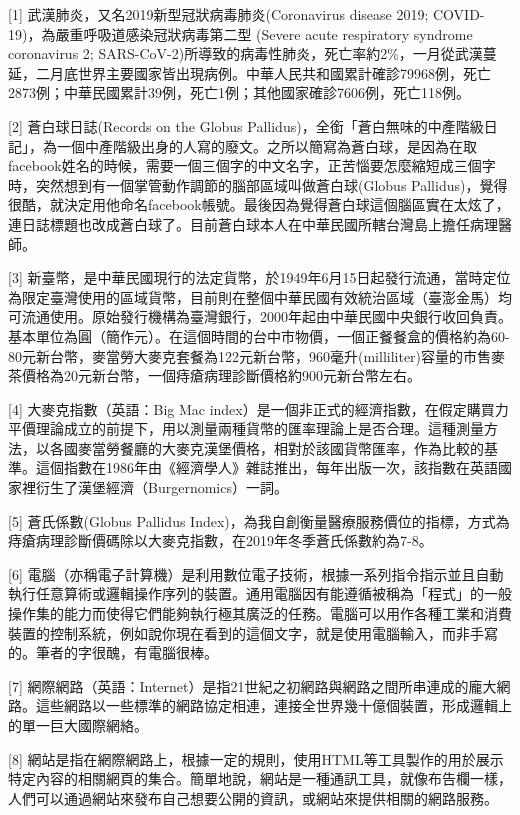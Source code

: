 \documentclass[
]{article}
\begin{document}
{[}1{]} 武漢肺炎，又名2019新型冠狀病毒肺炎(Coronavirus disease 2019;
COVID-19)，為嚴重呼吸道感染冠狀病毒第二型 (Severe acute respiratory
syndrome coronavirus 2;
SARS-CoV-2)所導致的病毒性肺炎，死亡率約2\%，一月從武漢蔓延，二月底世界主要國家皆出現病例。中華人民共和國累計確診79968例，死亡2873例；中華民國累計39例，死亡1例；其他國家確診7606例，死亡118例。

{[}2{]} 蒼白球日誌(Records on the Globus
Pallidus)，全銜「蒼白無味的中產階級日記」，為一個中產階級出身的人寫的廢文。之所以簡寫為蒼白球，是因為在取facebook姓名的時候，需要一個三個字的中文名字，正苦惱要怎麼縮短成三個字時，突然想到有一個掌管動作調節的腦部區域叫做蒼白球(Globus
Pallidus)，覺得很酷，就決定用他命名facebook帳號。最後因為覺得蒼白球這個腦區實在太炫了，連日誌標題也改成蒼白球了。目前蒼白球本人在中華民國所轄台灣島上擔任病理醫師。

{[}3{]}
新臺幣，是中華民國現行的法定貨幣，於1949年6月15日起發行流通，當時定位為限定臺灣使用的區域貨幣，目前則在整個中華民國有效統治區域（臺澎金馬）均可流通使用。原始發行機構為臺灣銀行，2000年起由中華民國中央銀行收回負責。基本單位為圓（簡作元）。在這個時間的台中市物價，一個正餐餐盒的價格約為60-80元新台幣，麥當勞大麥克套餐為122元新台幣，960毫升(milliliter)容量的市售麥茶價格為20元新台幣，一個痔瘡病理診斷價格約900元新台幣左右。

{[}4{]} 大麥克指數（英語：Big Mac
index）是一個非正式的經濟指數，在假定購買力平價理論成立的前提下，用以測量兩種貨幣的匯率理論上是否合理。這種測量方法，以各國麥當勞餐廳的大麥克漢堡價格，相對於該國貨幣匯率，作為比較的基準。這個指數在1986年由《經濟學人》雜誌推出，每年出版一次，該指數在英語國家裡衍生了漢堡經濟（Burgernomics）一詞。

{[}5{]} 蒼氏係數(Globus Pallidus
Index)，為我自創衡量醫療服務價位的指標，方式為痔瘡病理診斷價碼除以大麥克指數，在2019年冬季蒼氏係數約為7-8。

{[}6{]}
電腦（亦稱電子計算機）是利用數位電子技術，根據一系列指令指示並且自動執行任意算術或邏輯操作序列的裝置。通用電腦因有能遵循被稱為「程式」的一般操作集的能力而使得它們能夠執行極其廣泛的任務。電腦可以用作各種工業和消費裝置的控制系統，例如說你現在看到的這個文字，就是使用電腦輸入，而非手寫的。筆者的字很醜，有電腦很棒。

{[}7{]}
網際網路（英語：Internet）是指21世紀之初網路與網路之間所串連成的龐大網路。這些網路以一些標準的網路協定相連，連接全世界幾十億個裝置，形成邏輯上的單一巨大國際網絡。

{[}8{]}
網站是指在網際網路上，根據一定的規則，使用HTML等工具製作的用於展示特定內容的相關網頁的集合。簡單地說，網站是一種通訊工具，就像布告欄一樣，人們可以通過網站來發布自己想要公開的資訊，或網站來提供相關的網路服務。
\end{document}
